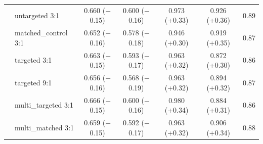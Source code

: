 \documentclass[11pt]{article}
\begin{document}
\begin{table}[t]
\begin{tabular}{llccccc}
& untargeted 3:1         & 0.660 ($-$0.15) & 0.600 ($-$0.16) & 0.973 (+0.33) & 0.926 (+0.36) & 0.89 \\
& matched\_control 3:1   & 0.652 ($-$0.16) & 0.578 ($-$0.18) & 0.946 (+0.30) & 0.919 (+0.35) & 0.87 \\
& targeted 3:1           & 0.663 ($-$0.15) & 0.593 ($-$0.17) & 0.963 (+0.32) & 0.872 (+0.30) & 0.86 \\
& targeted 9:1           & 0.656 ($-$0.16) & 0.568 ($-$0.19) & 0.963 (+0.32) & 0.894 (+0.32) & 0.87 \\
& multi\_targeted 3:1    & 0.666 ($-$0.15) & 0.600 ($-$0.16) & 0.980 (+0.34) & 0.884 (+0.31) & 0.86 \\
& multi\_matched 3:1     & 0.659 ($-$0.15) & 0.592 ($-$0.17) & 0.963 (+0.32) & 0.906 (+0.34) & 0.88 \\
\bottomrule
\end{tabular}
\end{table}
\end{document}
